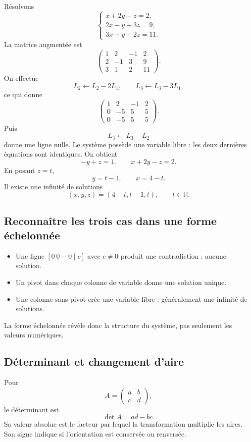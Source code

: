 \documentclass[12pt,a4paper,openany]{book}
\newcommand{\R}{\mathbb{R}}
\begin{document}
Résolvons
\[
\begin{cases}
x+2y-z=2,\\
2x-y+3z=9,\\
3x+y+2z=11.
\end{cases}
\]
La matrice augmentée est
\[
\left(
\begin{array}{ccc|c}
1&2&-1&2\\
2&-1&3&9\\
3&1&2&11
\end{array}
\right).
\]
On effectue
\[
L_2\leftarrow L_2-2L_1,
\qquad
L_3\leftarrow L_3-3L_1,
\]
ce qui donne
\[
\left(
\begin{array}{ccc|c}
1&2&-1&2\\
0&-5&5&5\\
0&-5&5&5
\end{array}
\right).
\]
Puis
\[
L_3\leftarrow L_3-L_2
\]
donne une ligne nulle. Le système possède une variable libre : les deux dernières équations sont identiques. On obtient
\[
-y+z=1,
\qquad
x+2y-z=2.
\]
En posant $z=t$,
\[
y=t-1,
\qquad
x=4-t.
\]
Il existe une infinité de solutions
\[
(x,y,z)=(4-t,t-1,t),
\qquad t\in\R.
\]

\subsection{Reconnaître les trois cas dans une forme échelonnée}

\begin{itemize}
\item Une ligne $[0\ 0\ \cdots\ 0\mid c]$ avec $c\neq0$ produit une contradiction : aucune solution.
\item Un pivot dans chaque colonne de variable donne une solution unique.
\item Une colonne sans pivot crée une variable libre : généralement une infinité de solutions.
\end{itemize}
La forme échelonnée révèle donc la structure du système, pas seulement les valeurs numériques.

\subsection{Déterminant et changement d'aire}

Pour
\[
A=\begin{pmatrix}a&b\\c&d\end{pmatrix},
\]
le déterminant est
\[
\det A=ad-bc.
\]
Sa valeur absolue est le facteur par lequel la transformation multiplie les aires. Son signe indique si l'orientation est conservée ou renversée.
\end{document}
